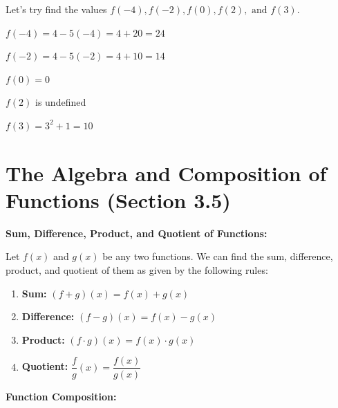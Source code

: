 \documentclass[12pt]{article}
\begin{document}
 Let's try find the values $f(-4), f(-2), f(0), f(2),\text{ and } f(3)$. 

$f(-4) = 4 - 5(-4) = 4+ 20 = 24$ 

$f(-2) = 4-5(-2) = 4+10 = 14$ 

$f(0) = 0$ 

$f(2)$ is undefined 

$f(3) = 3^2 + 1 = 10$ 


\section{The Algebra and Composition of Functions (Section 3.5)}

\textbf{Sum, Difference, Product, and Quotient of Functions:}

Let $f(x)$ and $g(x)$ be any two functions. We can find the sum, difference, product, and quotient of them as given by the following rules:
\begin{enumerate}

\item \textbf{Sum:} $(f + g)(x) = f(x) + g(x)$
\item \textbf{Difference:} $(f - g)(x) = f(x) - g(x)$
\item \textbf{Product:} $(f  \cdot g)(x) = f(x) \cdot g(x)$
\item \textbf{Quotient:} $\dfrac{f}{g}(x) = \dfrac{f(x)}{g(x)}$

\end{enumerate}

\textbf{Function Composition:} 
\end{document}
